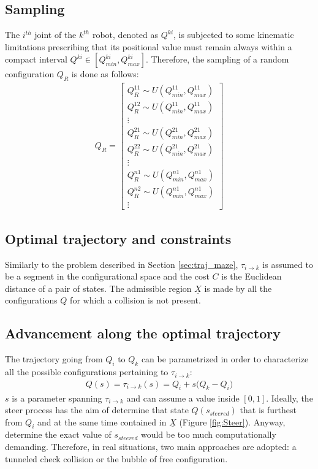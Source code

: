 \subsection{Sampling}

The $i^{th}$ joint of the $k^{th}$ robot, denoted as $Q^{ki}$, is subjected to some kinematic limitations prescribing that its positional value must remain always within a compact interval $Q^{ki} \in [Q^{ki}_{min} , Q^{ki}_{max}]$. Therefore, the sampling of a random configuration $Q_R$ is done as follows:
\begin{eqnarray}
Q_R = \begin{bmatrix} 
Q^{11}_R \sim U(Q^{11}_{min},Q^{11}_{max}) \\
Q^{12}_R \sim U(Q^{11}_{min},Q^{11}_{max}) \\
\vdots \\ 
Q^{21}_R \sim U(Q^{21}_{min},Q^{21}_{max}) \\
Q^{22}_R \sim U(Q^{21}_{min},Q^{21}_{max}) \\
\vdots \\
Q^{n1}_R \sim U(Q^{n1}_{min},Q^{n1}_{max}) \\
Q^{n2}_R \sim U(Q^{n1}_{min},Q^{n1}_{max}) \\
\vdots
\end{bmatrix}
\end{eqnarray}

\subsection{Optimal trajectory and constraints}

Similarly to the problem described in Section \ref{sec:traj_maze}, $\tau_{i \rightarrow k}$ is assumed to be a segment in the configurational space and the cost $C$ is the Euclidean distance of a pair of states.
The admissible region $\underline{X}$ is made by all the configurations $Q$ for which a collision is not present.

\subsection{Advancement along the optimal trajectory}
\label{sec:steer_articulated}

The trajectory going from $Q_i$ to $Q_k$ can be parametrized in order to characterize all the possible configurations pertaining to $\tau_{i \rightarrow k}$:
\begin{eqnarray}
 Q(s) = \tau_{i \rightarrow k}(s) = Q_i + s \bigg ( Q_k - Q_i \bigg )
\label{eq:Q_composite}
\end{eqnarray}
$s$ is a parameter spanning $\tau_{i \rightarrow k}$ and can assume a value inside $[0,1]$.
Ideally, the steer process has the aim of determine that state $Q(s_{steered})$ that is furthest from $Q_i$ and at the same time contained in $\underline{X}$ (Figure \ref{fig:Steer}). Anyway, determine the exact value of $s_{steered}$ would be too much computationally demanding. Therefore, in real situations, two main approaches are adopted: a tunneled check collision or the bubble of free configuration.

